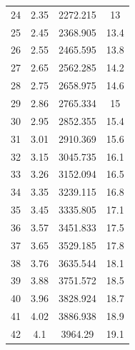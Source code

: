 \documentclass[%
 aip,
 amsmath,amssymb,
 reprint,%
]{revtex4-1}
\begin{document}
\begin{table}[]
\begin{tabular}{@{}cccc@{}}
24 & 2.35 & 2272.215 & 13   \\
25 & 2.45 & 2368.905 & 13.4 \\
26 & 2.55 & 2465.595 & 13.8 \\
27 & 2.65 & 2562.285 & 14.2 \\
28 & 2.75 & 2658.975 & 14.6 \\
29 & 2.86 & 2765.334 & 15   \\
30 & 2.95 & 2852.355 & 15.4 \\
31 & 3.01 & 2910.369 & 15.6 \\
32 & 3.15 & 3045.735 & 16.1 \\
33 & 3.26 & 3152.094 & 16.5 \\
34 & 3.35 & 3239.115 & 16.8 \\
35 & 3.45 & 3335.805 & 17.1 \\
36 & 3.57 & 3451.833 & 17.5 \\
37 & 3.65 & 3529.185 & 17.8 \\
38 & 3.76 & 3635.544 & 18.1 \\
39 & 3.88 & 3751.572 & 18.5 \\
40 & 3.96 & 3828.924 & 18.7 \\
41 & 4.02 & 3886.938 & 18.9 \\
42 & 4.1  & 3964.29  & 19.1 \\ \bottomrule
\end{tabular}
\end{table}
\end{document}
